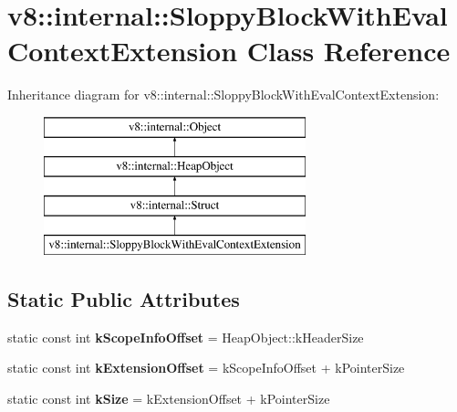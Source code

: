 \hypertarget{classv8_1_1internal_1_1_sloppy_block_with_eval_context_extension}{}\section{v8\+:\+:internal\+:\+:Sloppy\+Block\+With\+Eval\+Context\+Extension Class Reference}
\label{classv8_1_1internal_1_1_sloppy_block_with_eval_context_extension}
Inheritance diagram for v8\+:\+:internal\+:\+:Sloppy\+Block\+With\+Eval\+Context\+Extension\+:\begin{figure}[H]
\begin{center}
\leavevmode
\includegraphics[height=4.000000cm]{classv8_1_1internal_1_1_sloppy_block_with_eval_context_extension}
\end{center}
\end{figure}
\subsection*{Static Public Attributes}
\begin{DoxyCompactItemize}
\item 
static const int {\bfseries k\+Scope\+Info\+Offset} = Heap\+Object\+::k\+Header\+Size\hypertarget{classv8_1_1internal_1_1_sloppy_block_with_eval_context_extension_acc4bb1076d9a5e0e0804e1510675e5ca}{}\label{classv8_1_1internal_1_1_sloppy_block_with_eval_context_extension_acc4bb1076d9a5e0e0804e1510675e5ca}

\item 
static const int {\bfseries k\+Extension\+Offset} = k\+Scope\+Info\+Offset + k\+Pointer\+Size\hypertarget{classv8_1_1internal_1_1_sloppy_block_with_eval_context_extension_a57390271f6aa9be6f2cb2327228d1d58}{}\label{classv8_1_1internal_1_1_sloppy_block_with_eval_context_extension_a57390271f6aa9be6f2cb2327228d1d58}

\item 
static const int {\bfseries k\+Size} = k\+Extension\+Offset + k\+Pointer\+Size\hypertarget{classv8_1_1internal_1_1_sloppy_block_with_eval_context_extension_aed7d2bfa0bc2619ed0aa61e83309e889}{}\label{classv8_1_1internal_1_1_sloppy_block_with_eval_context_extension_aed7d2bfa0bc2619ed0aa61e83309e889}

\end{DoxyCompactItemize}
